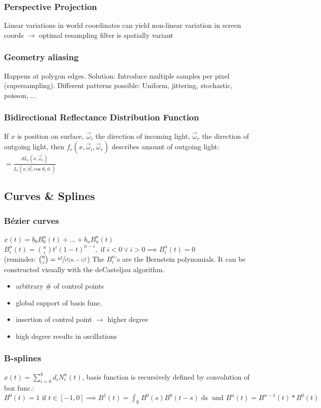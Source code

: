 \documentclass[a4paper,10pt]{article}
\newcommand*\good{\item[\textcolor{goodgreen}{\(\bm{+}\)}]}
\newcommand*\bad{\item[\textcolor{badred}{\(\bm{-}\)}]}
\begin{document}
\subsubsection{Perspective Projection} Linear variations in world coordinates can yield non-linear variation in screen coords \( \to  \) optimal resampling filter is spatially variant
\subsubsection{Geometry aliasing} Happens at polygon edges. Solution: Introduce multiple samples per pixel (supersampling). Different patterns possible: Uniform, jittering, stochastic, poisson, ...

\subsubsection{Bidirectional Reflectance Distribution Function}
If \( x \) is position on surface, \( \vec{\omega}_i \) the direction of incoming light, \( \vec{\omega}_r \) the direction of outgoing light, then \( f_r(x, \vec{\omega}_i, \vec{\omega}_r) \) describes amount of outgoing light:
\( = \frac{dL_r(x, \vec{\omega}_r)}{L_i(x, \vec{w}_i \cos \theta _i \mathop{d\vec{w}_i})} \)

\subsection{Curves \& Splines}
\subsubsection{Bézier curves}
\( x(t) = b_0 B^n_0(t) + \ldots + b_n B^n_n (t) \) \\
\( B^n_i(t) = \binom{n}{i} t^i (1-t)^{n-i}, \text{ if } i < 0 \lor i >0 \implies B^n_i (t) = 0 \) \\
(reminder: \( \binom{n}{i} = \sfrac{n!}{i!(n-i)!} \)) The \( B^n_i \)'s are the Bernstein polynomials.
It can be constructed visually with the deCasteljau algorithm. 
\begin{itemize}
    \good arbitrary \# of control points
    \bad global support of basis func.
    \bad insertion of control point \( \to  \) higher degree
    \bad high degree results in oscillations
\end{itemize}

\subsubsection{B-splines}
\( x(t) = \sum_{i=0}^k d_i N_i^n (t) \), basis function is recursively defined by convolution of box func.: 
\( B^0(t) = 1 \text{ if } t \in [-1, 0] \implies B^1(t) = \int_\mathbb{R} B^0(s) B^0(t-s) \mathop{ds} \text{ und } B^n(t) = B^{n-1}(t) * B^0(t)\)
\end{document}
